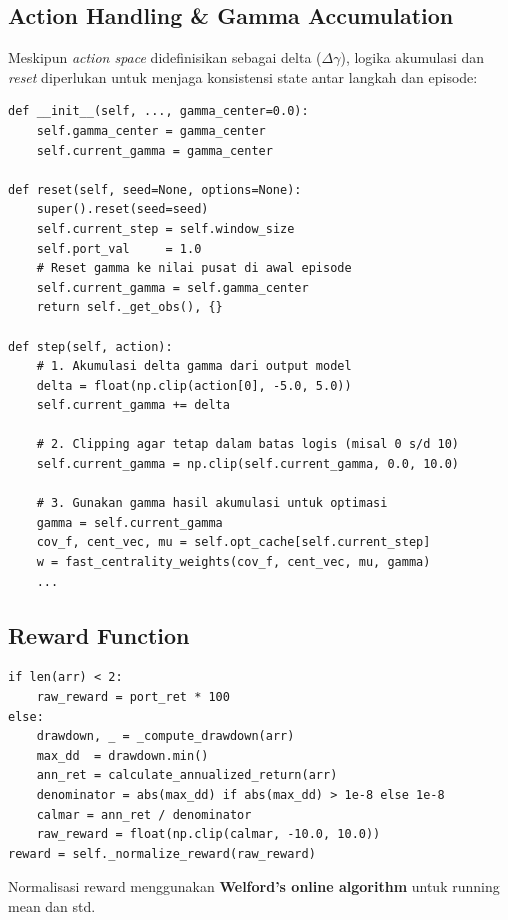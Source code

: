 \documentclass[12pt,a4paper]{article}
\begin{document}
\subsection{Action Handling \& Gamma Accumulation}

Meskipun \emph{action space} didefinisikan sebagai delta ($\Delta\gamma$), logika akumulasi dan \emph{reset} diperlukan untuk menjaga konsistensi state antar langkah dan episode:

\begin{lstlisting}[caption={Logika Akumulasi Delta Gamma}]
def __init__(self, ..., gamma_center=0.0):
    self.gamma_center = gamma_center
    self.current_gamma = gamma_center

def reset(self, seed=None, options=None):
    super().reset(seed=seed)
    self.current_step = self.window_size
    self.port_val     = 1.0
    # Reset gamma ke nilai pusat di awal episode
    self.current_gamma = self.gamma_center
    return self._get_obs(), {}

def step(self, action):
    # 1. Akumulasi delta gamma dari output model
    delta = float(np.clip(action[0], -5.0, 5.0))
    self.current_gamma += delta
    
    # 2. Clipping agar tetap dalam batas logis (misal 0 s/d 10)
    self.current_gamma = np.clip(self.current_gamma, 0.0, 10.0)
    
    # 3. Gunakan gamma hasil akumulasi untuk optimasi
    gamma = self.current_gamma
    cov_f, cent_vec, mu = self.opt_cache[self.current_step]
    w = fast_centrality_weights(cov_f, cent_vec, mu, gamma)
    ...
\end{lstlisting}

\subsection{Reward Function}

\begin{lstlisting}[caption={Reward: Calmar Ratio Berbasis Rolling Window}]
if len(arr) < 2:
    raw_reward = port_ret * 100
else:
    drawdown, _ = _compute_drawdown(arr)
    max_dd  = drawdown.min()
    ann_ret = calculate_annualized_return(arr)
    denominator = abs(max_dd) if abs(max_dd) > 1e-8 else 1e-8
    calmar = ann_ret / denominator
    raw_reward = float(np.clip(calmar, -10.0, 10.0))
reward = self._normalize_reward(raw_reward)
\end{lstlisting}

Normalisasi reward menggunakan \textbf{Welford's online algorithm} untuk running mean dan std.
\end{document}
